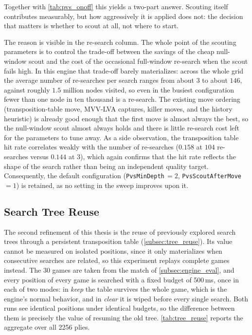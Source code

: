 Together with \cref{tab:pvs_onoff} this yields a two-part answer. Scouting itself
contributes measurably, but how aggressively it is applied does not: the decision
that matters is whether to scout at all, not where to start.

The reason is visible in the re-search column. The whole point of the scouting
parameters is to control the trade-off between the savings of the cheap
null-window scout and the cost of the occasional full-window re-search when the
scout fails high. In this engine that trade-off barely materializes: across the
whole grid the average number of re-searches per search ranges from about $3$ to
about $146$, against roughly $1.5$ million nodes visited, so even in the busiest
configuration fewer than one node in ten thousand is a re-search. The existing
move ordering (transposition-table move, MVV-LVA captures, killer moves, and the
history heuristic) is already good enough that the first move is almost always
the best, so the null-window scout almost always holds and there is little
re-search cost left for the parameters to tune away. As a side observation, the
transposition table hit rate correlates weakly with the number of re-searches
($0.158$ at $104$ re-searches versus $0.144$ at $3$), which again confirms that
the hit rate reflects the shape of the search rather than being an independent
quality target. Consequently, the default configuration
(\texttt{PvsMinDepth}\,$=2$, \texttt{PvsScoutAfterMove}\,$=1$) is retained, as no
setting in the sweep improves upon it.

\subsection{Search Tree Reuse}
\label{subsec:eval_tree_reuse}

The second refinement of this thesis is the reuse of previously explored search
trees through a persistent transposition table (\cref{subsec:tree_reuse}). Its
value cannot be measured on isolated positions, since it only materializes when
consecutive searches are related, so this experiment replays complete games
instead. The 30 games are taken from the match of \cref{subsec:engine_eval}, and
every position of every game is searched with a fixed budget of 500\,ms, once in
each of two modes: in \emph{keep} the table survives the whole game, which is the
engine's normal behavior, and in \emph{clear} it is wiped before every single
search. Both runs see identical positions under identical budgets, so the
difference between them is precisely the value of resuming the old tree.
\cref{tab:tree_reuse} reports the aggregate over all 2256 plies.

